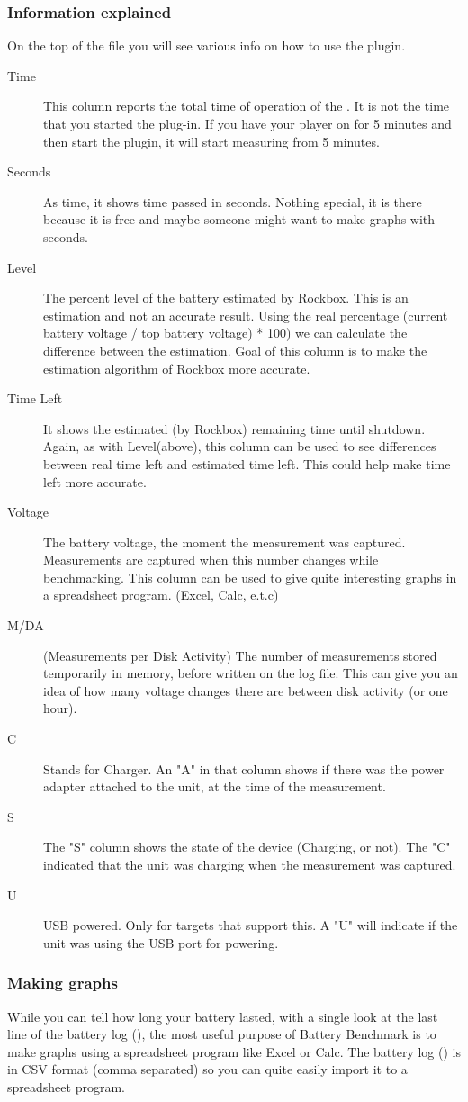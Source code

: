 \subsubsection{Information explained}
On the top of the file you will see various info on how to use the plugin.
\begin{description}
\item[Time] This column reports the total time of operation of the \dap. It is 
not the time that you started the plug-in. If you have your player on for 5 
minutes and then start the plugin, it will start measuring from 5 minutes.
\item[Seconds] As time, it shows time passed in seconds. Nothing special, it is
there because it is free and maybe someone might want to make graphs with
seconds.
\item[Level] The percent level of the battery estimated by Rockbox. This is an
estimation and not an accurate result. Using the real percentage (current
battery voltage / top battery voltage) * 100) we can calculate the difference
between the estimation. Goal of this column is to make the estimation algorithm
of Rockbox more accurate.
\item[Time Left] It shows the estimated (by Rockbox) remaining time until
shutdown. Again, as with Level(above), this column can be used to see 
differences between real time left and estimated time left. This could help 
make time left more accurate.
\item[Voltage] The battery voltage, the moment the measurement was captured. 
Measurements are captured when this number changes while benchmarking.
This column can be used to give quite interesting graphs in a spreadsheet
program. (Excel, Calc, e.t.c)
\item[M/DA] (Measurements per Disk Activity) The number of measurements stored
temporarily in memory, before written on the log file. This can give you an
idea of how many voltage changes there are between disk activity (or one hour).
\item[C] Stands for Charger. An "A" in that column shows if there was the power
adapter attached to the unit, at the time of the measurement.
\item[S] The "S" column shows the state of the device (Charging, or not). The
"C" indicated that the unit was charging when the measurement was captured.
\item[U] USB powered. Only for targets that support this. A "U" will indicate
if the unit was using the USB port for powering. 
\end{description}

\subsubsection{Making graphs}
While you can tell how long your battery lasted, with a single look at the last
line of the battery log (), the most useful purpose of
Battery Benchmark is to make graphs using a spreadsheet program like Excel or
Calc. The battery log () is in CSV format (comma separated)
so you can quite easily import it to a spreadsheet program.
